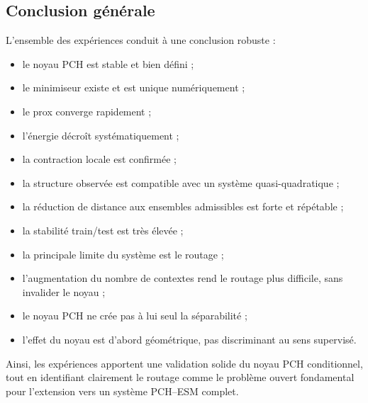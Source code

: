 \documentclass[11pt,a4paper]{article}
\newcommand{\1}{\mathbf 1}
\begin{document}
\subsection{Conclusion générale}

L’ensemble des expériences conduit à une conclusion robuste :

\begin{itemize}[leftmargin=2em]
\item le noyau PCH est stable et bien défini ;
\item le minimiseur existe et est unique numériquement ;
\item le prox converge rapidement ;
\item l’énergie décroît systématiquement ;
\item la contraction locale est confirmée ;
\item la structure observée est compatible avec un système quasi-quadratique ;
\item la réduction de distance aux ensembles admissibles est forte et répétable ;
\item la stabilité train/test est très élevée ;
\item la principale limite du système est le routage ;
\item l’augmentation du nombre de contextes rend le routage plus difficile, sans invalider le noyau ;
\item le noyau PCH ne crée pas à lui seul la séparabilité ;
\item l’effet du noyau est d’abord géométrique, pas discriminant au sens supervisé.
\end{itemize}

Ainsi, les expériences apportent une validation solide du noyau PCH conditionnel, tout en identifiant clairement le routage comme le problème ouvert fondamental pour l’extension vers un système PCH--ESM complet.
\end{document}

